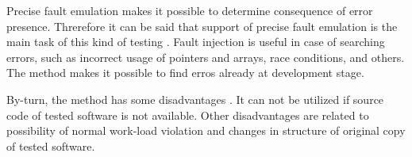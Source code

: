 %
Precise fault emulation makes it possible to determine consequence of error presence. 
%
Threrefore it can be said that support of precise fault emulation is the main task of this kind of testing . 
%
Fault injection is useful in case of searching errors, such as incorrect usage of pointers and arrays, race conditions, and others. 
%
The method makes it possible to find erros already at development stage. 

%
By-turn, the method has some disadvantages . 
%
It can not be utilized if source code of tested software is not available. 
%
Other disadvantages are related to possibility of normal work-load violation and changes in structure of original copy of tested software. 